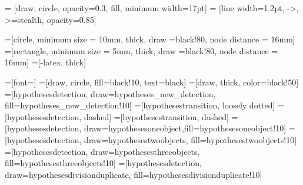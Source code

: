 \usepackage{tikz}
\usetikzlibrary{arrows}
\usetikzlibrary{snakes}
\usetikzlibrary{backgrounds}
\usetikzlibrary{patterns}
\usetikzlibrary{matrix}
\usetikzlibrary{shapes}
\usetikzlibrary{fit}
\usetikzlibrary{calc}
\usetikzlibrary{shadows}
\usetikzlibrary{plotmarks}
\usetikzlibrary{positioning}
\usetikzlibrary{fadings}
\usetikzlibrary{shapes.arrows}

 = [draw, circle, opacity=0.3, fill, minimum width=17pt]
 = [line width=1.2pt, ->, >=stealth, opacity=0.85]




=[circle, minimum size = 10mm, thick, draw =black!80, node distance = 16mm]
=[rectangle, minimum size = 5mm, thick, draw =black!80, node distance = 16mm]
=[-latex, thick]



=[font=\huge]
=[draw, circle, fill=black!10, text=black]
=[draw, thick, color=black!50]
=[hypothesesdetection, draw=hypotheses_new_detection, fill=hypotheses_new_detection!10]
=[hypothesestransition, loosely dotted]
=[hypothesesdetection, dashed]
=[hypothesestransition, dashed]
=[hypothesesdetection, draw=hypothesesoneobject,fill=hypothesesoneobject!10]
=[hypothesesdetection, draw=hypothesestwoobjects, fill=hypothesestwoobjects!10]
=[hypothesesdetection, draw=hypothesesthreeobjects, fill=hypothesesthreeobjects!10]
=[hypothesesdetection, draw=hypothesesdivisionduplicate,
fill=hypothesesdivisionduplicate!10]


